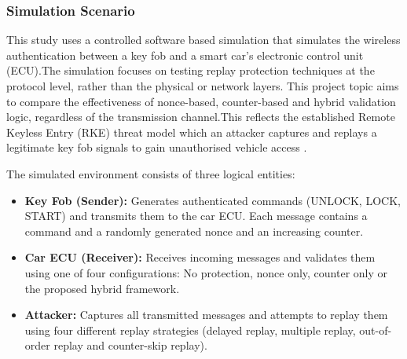 \documentclass[a4paper,man,12pt]{article}
\begin{document}


\subsubsection{Simulation Scenario}

This study uses a controlled software based simulation that simulates the wireless authentication between a key fob and a smart car's electronic control unit (ECU).The simulation focuses on testing replay protection techniques at the protocol level, rather than the physical or network layers. This project topic aims to compare the effectiveness of nonce-based, counter-based and hybrid validation logic, regardless of the transmission channel.This reflects the established Remote Keyless Entry (RKE) threat model which an attacker captures and replays a legitimate key fob signals to gain unauthorised vehicle access \parencite{001B, 002B}.\bigbreak

The simulated environment consists of three logical entities:

\begin{itemize}
    \item \textbf{Key Fob (Sender):} Generates authenticated commands (UNLOCK,
    LOCK, START) and transmits them to the car ECU. Each message contains a
    command and a randomly generated nonce and an increasing counter.

    \item \textbf{Car ECU (Receiver):} Receives incoming messages and validates
    them using one of four configurations: No protection, nonce only,
    counter only or the proposed hybrid framework.

    \item \textbf{Attacker:} Captures all transmitted messages and attempts to
    replay them using four different replay strategies (delayed replay, multiple
    replay, out-of-order replay and counter-skip replay).

\end{itemize}
\end{document}
